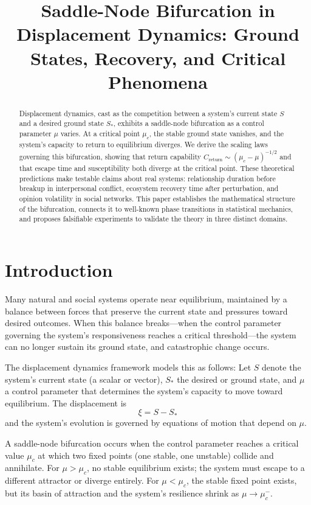 \documentclass[12pt]{article}
\title{Saddle-Node Bifurcation in Displacement Dynamics: Ground States, Recovery, and Critical Phenomena}
\author{}
\date{}
\begin{document}
\maketitle

\begin{abstract}
Displacement dynamics, cast as the competition between a system's current state $S$ and a desired ground state $S_*$, exhibits a saddle-node bifurcation as a control parameter $\mu$ varies. At a critical point $\mu_c$, the stable ground state vanishes, and the system's capacity to return to equilibrium diverges. We derive the scaling laws governing this bifurcation, showing that return capability $C_{\text{return}} \sim (\mu_c - \mu)^{-1/2}$ and that escape time and susceptibility both diverge at the critical point. These theoretical predictions make testable claims about real systems: relationship duration before breakup in interpersonal conflict, ecosystem recovery time after perturbation, and opinion volatility in social networks. This paper establishes the mathematical structure of the bifurcation, connects it to well-known phase transitions in statistical mechanics, and proposes falsifiable experiments to validate the theory in three distinct domains.
\end{abstract}

\section{Introduction}

Many natural and social systems operate near equilibrium, maintained by a balance between forces that preserve the current state and pressures toward desired outcomes. When this balance breaks---when the control parameter governing the system's responsiveness reaches a critical threshold---the system can no longer sustain its ground state, and catastrophic change occurs.

The displacement dynamics framework models this as follows: Let $S$ denote the system's current state (a scalar or vector), $S_*$ the desired or ground state, and $\mu$ a control parameter that determines the system's capacity to move toward equilibrium. The displacement is
\begin{equation}
\xi = S - S_*
\end{equation}
and the system's evolution is governed by equations of motion that depend on $\mu$.

A saddle-node bifurcation occurs when the control parameter reaches a critical value $\mu_c$ at which two fixed points (one stable, one unstable) collide and annihilate. For $\mu > \mu_c$, no stable equilibrium exists; the system must escape to a different attractor or diverge entirely. For $\mu < \mu_c$, the stable fixed point exists, but its basin of attraction and the system's resilience shrink as $\mu \to \mu_c^-$.
\end{document}
